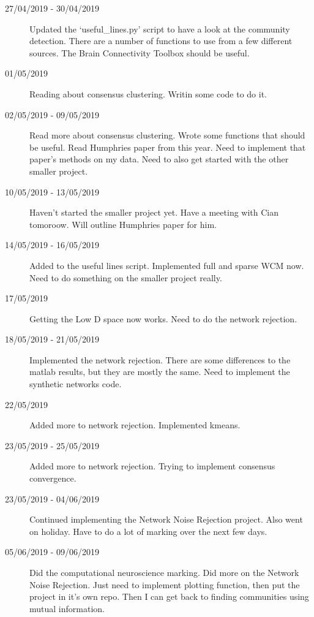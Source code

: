 \documentclass[a4paper,12pt]{article}
\theoremstyle{definition}
\begin{document}
\begin{description}
	\item[27/04/2019 - 30/04/2019] Updated the `useful\_lines.py' script to have a look at the community detection. There are a number of functions to use from a few different sources. The Brain Connectivity Toolbox should be useful.

	\item[01/05/2019] Reading about consensus clustering. Writin some code to do it.

	\item[02/05/2019 - 09/05/2019] Read more about consensus clustering. Wrote some functions that should be useful. Read Humphries paper from this year. Need to implement that paper's methods on my data. Need to also get started with the other smaller project.

	\item[10/05/2019 - 13/05/2019] Haven't started the smaller project yet. Have a meeting with Cian tomoroow. Will outline Humphries paper for him.

	\item[14/05/2019 - 16/05/2019] Added to the useful lines script. Implemented full and sparse WCM now. Need to do something on the smaller project really.

	\item[17/05/2019] Getting the Low D space now works. Need to do the network rejection.

	\item[18/05/2019 - 21/05/2019] Implemented the network rejection. There are some differences to the matlab results, but they are mostly the same. Need to implement the synthetic networks code.

	\item[22/05/2019] Added more to network rejection. Implemented kmeans.

	\item[23/05/2019 - 25/05/2019] Added more to network rejection. Trying to implement consensus convergence.

	\item[23/05/2019 - 04/06/2019] Continued implementing the Network Noise Rejection project. Also went on holiday. Have to do a lot of marking over the next few days.

	\item[05/06/2019 - 09/06/2019] Did the computational neuroscience marking. Did more on the Network Noise Rejection. Just need to implement plotting function, then put the project in it's own repo. Then I can get back to finding communities using mutual information.


\end{description}
\end{document}
